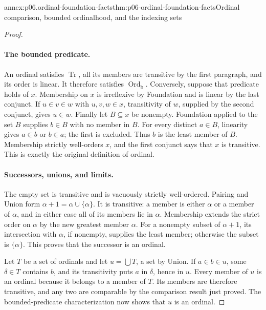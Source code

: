 \begin{annexitem}{annex:p06.ordinal-foundation-facts}{thm:p06-ordinal-foundation-facts}{Ordinal comparison, bounded ordinalhood, and the indexing sets}
\begin{proof}
\paragraph{The bounded predicate.}
An ordinal satisfies \(\operatorname{Tr}\), all its members are
transitive by the first paragraph, and its order is linear.  It
therefore satisfies \(\operatorname{Ord}_{\mathrm b}\).
Conversely, suppose that predicate holds of \(x\).  Membership on
\(x\) is irreflexive by Foundation and is linear by the last
conjunct.  If \(u\in v\in w\) with \(u,v,w\in x\), transitivity
of \(w\), supplied by the second conjunct, gives \(u\in w\).
Finally let \(B\subseteq x\) be nonempty.  Foundation applied to
the set \(B\) supplies \(b\in B\) with no member in \(B\).
For every distinct \(a\in B\), linearity gives \(a\in b\) or
\(b\in a\); the first is excluded.  Thus \(b\) is the least
member of \(B\).  Membership strictly well-orders \(x\), and
the first conjunct says that \(x\) is transitive.  This is exactly
the original definition of ordinal.

\paragraph{Successors, unions, and limits.}
The empty set is transitive and is vacuously strictly well-ordered.
Pairing and Union form \(\alpha+1=\alpha\cup\{\alpha\}\).
It is transitive: a member is either \(\alpha\) or a member of
\(\alpha\), and in either case all of its members lie in
\(\alpha\).  Membership extends the strict order on \(\alpha\)
by the new greatest member \(\alpha\).  For a nonempty subset of
\(\alpha+1\), its intersection with \(\alpha\), if nonempty,
supplies the least member; otherwise the subset is \(\{\alpha\}\).
This proves that the successor is an ordinal.

Let \(T\) be a set of ordinals and let \(u=\bigcup T\), a set
by Union.  If \(a\in b\in u\), some \(\delta\in T\) contains
\(b\), and its transitivity puts \(a\) in \(\delta\), hence in
\(u\).  Every member of \(u\) is an ordinal because it belongs
to a member of \(T\).  Its members are therefore transitive,
and any two are comparable by the comparison result just proved.
The bounded-predicate characterization now shows that \(u\) is
an ordinal.


\end{proof}
\end{annexitem}
